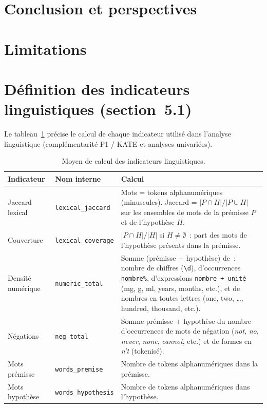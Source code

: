 \documentclass[10pt,twoside]{article}
\begin{document}
\section{Conclusion et perspectives}

\section{Limitations}

\appendix
\section{Définition des indicateurs linguistiques (section~5.1)}
\label{sec:annexe-metriques}

Le tableau~\ref{tab:annexe-metriques} précise le calcul de chaque indicateur utilisé dans l'analyse linguistique (complémentarité P1 / KATE et analyses univariées).

\begin{table}[H]
\centering
\caption{Moyen de calcul des indicateurs linguistiques.}
\label{tab:annexe-metriques}
\scriptsize
\begin{tabular}{llp{6.5cm}}
\toprule
Indicateur & Nom interne & Calcul \\
\midrule
Jaccard lexical & \texttt{lexical\_jaccard} & Mots = tokens alphanumériques (minuscules). Jaccard = $|P \cap H| / |P \cup H|$ sur les ensembles de mots de la prémisse $P$ et de l'hypothèse $H$. \\
Couverture & \texttt{lexical\_coverage} & $|P \cap H| / |H|$ si $H \neq \emptyset$~: part des mots de l'hypothèse présents dans la prémisse. \\
Densité numérique & \texttt{numeric\_total} & Somme (prémisse + hypothèse) de~: nombre de chiffres (\texttt{\textbackslash d}), d'occurrences \texttt{nombre\%}, d'expressions \texttt{nombre + unité} (mg, g, ml, years, months, etc.), et de nombres en toutes lettres (one, two, \ldots, hundred, thousand, etc.). \\
Négations & \texttt{neg\_total} & Somme prémisse + hypothèse du nombre d'occurrences de mots de négation (\textit{not}, \textit{no}, \textit{never}, \textit{none}, \textit{cannot}, etc.) et de formes en \textit{n't} (tokenisé). \\
Mots prémisse & \texttt{words\_premise} & Nombre de tokens alphanumériques dans la prémisse. \\
Mots hypothèse & \texttt{words\_hypothesis} & Nombre de tokens alphanumériques dans l'hypothèse. \\
\bottomrule
\end{tabular}
\end{table}
\end{document}
